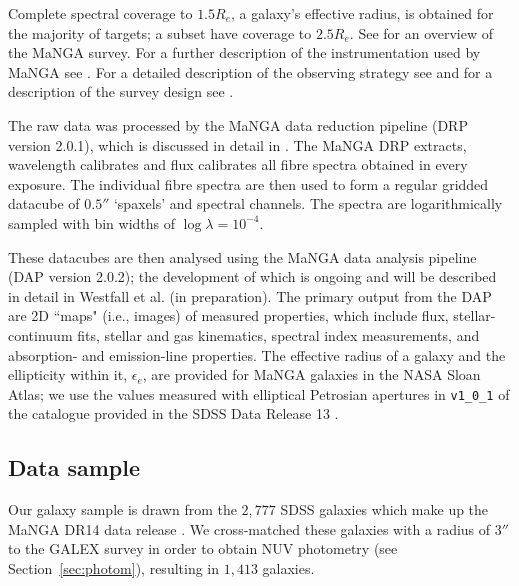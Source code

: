 \documentclass[useAMS,usenatbib]{mn2e}
\begin{document}
Complete spectral coverage to $1.5 R_e$, a galaxy's effective radius, is obtained for the majority of targets; a subset have coverage to $2.5 R_e$. See \cite{bundy15} for an overview of the MaNGA survey. For a further description of the instrumentation used by MaNGA see \cite{drory15}. For a detailed description of the observing strategy see \cite{law15} and for a description of the survey design see \cite{yan16}. %

The raw data was processed by the MaNGA data reduction pipeline (DRP version 2.0.1), which is discussed in detail in \cite{law16}. The MaNGA DRP extracts, wavelength calibrates and flux calibrates all fibre spectra obtained in every exposure. The individual fibre spectra are then used to form a regular gridded datacube of $0.5''$ ‘spaxels’ and spectral channels. The spectra are logarithmically sampled with bin widths of $\log{\lambda} = 10^{-4}$. 

These datacubes are then analysed using the MaNGA data analysis pipeline (DAP version 2.0.2); the development of which is ongoing and will be described in detail in Westfall et al. (in preparation). The primary output from the DAP are 2D ``maps" (i.e., images) of measured properties, which include flux, stellar-continuum fits, stellar and gas kinematics, spectral index measurements, and absorption- and emission-line properties. The effective radius of a galaxy and the ellipticity within it, $\epsilon_e$, are provided for MaNGA galaxies in the NASA Sloan Atlas; we use the values measured with elliptical Petrosian apertures in {\tt v1\_0\_1} of the catalogue provided in the SDSS Data Release 13 \citep{albareti16}. 

\subsection{Data sample}\label{sec:mangasample}

Our galaxy sample is drawn from the $2,777$ SDSS galaxies which make up the MaNGA DR14 data release \citep{dr14}. We cross-matched these galaxies with a radius of $3''$ to the GALEX survey in order to obtain NUV photometry (see Section~\ref{sec:photom}), resulting in $1,413$ galaxies.
\end{document}
